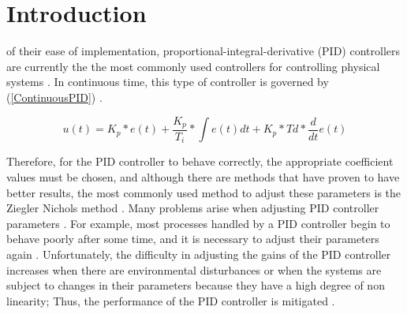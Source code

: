 \documentclass{ieeeaccess}
\begin{document}
\titlepgskip=-15pt

\maketitle

\section{Introduction}
\label{sec:introduction}
 of their ease of implementation, proportional-integral-derivative (PID) controllers are currently the
the most commonly used controllers for controlling physical systems \cite{bari_artificial_2019}. In continuous time, this type of controller is governed by (\ref{ContinuousPID}) \cite{rincon_godoy_diseno_2021}.


\begin{equation}\label{ContinuousPID}
 u\left(t\right)=K_p\ast e\left(t\right)+\frac{K_p}{T_i}\ast\int e\left(t\right)dt+K_p\ast Td\ast\frac{d}{dt}e(t)
\end{equation}

Therefore, for the PID controller to behave correctly, the appropriate coefficient values must be chosen, and although there are methods that have proven to have better results, the most commonly used method to adjust these parameters is the Ziegler Nichols method \cite{rodriguez-abreo_self-tuning_2021}. Many problems arise when adjusting PID controller parameters \cite{lisitsyn_adaptive_2019}. For example, most processes handled by a PID controller begin to behave poorly after some time, and it is necessary to adjust their parameters again \cite{somefun_dilemma_2021}. Unfortunately, the difficulty in adjusting the gains of the PID controller increases when there are environmental disturbances or when the systems are subject to changes in their parameters because they have a high degree of non linearity; Thus, the performance of the PID controller is mitigated \cite{bari_artificial_2019}.
\end{document}
